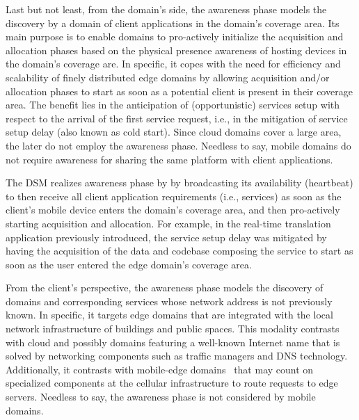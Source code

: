 
Last but not least, from the domain's side, the awareness phase models the discovery by a domain of client applications in the domain's coverage area. Its main purpose is to enable domains to pro-actively initialize the acquisition and allocation phases based on the physical presence awareness of hosting devices in the domain's coverage are. In specific, it copes with the need for efficiency and scalability of finely distributed edge domains by allowing acquisition and/or allocation phases to start as soon as a potential client is present in their coverage area. The benefit lies in the anticipation of (opportunistic) services setup with respect to the arrival of the first service request, i.e., in the mitigation of service setup delay (also known as cold start). Since cloud domains cover a large area, the later do not employ the awareness phase. Needless to say, mobile domains do not require awareness for sharing the same platform with client applications.

The DSM realizes awareness phase by by broadcasting its availability (heartbeat) to then receive all client application requirements (i.e., services) as soon as the client's mobile device enters the domain's coverage area, and then pro-actively starting acquisition and allocation. For example, in the real-time translation application previously introduced, the service setup delay was mitigated by having the acquisition of the data and codebase composing the service to start as soon as the user entered the edge domain's coverage area.

From the client's perspective, the awareness phase models the discovery of domains and corresponding services whose network address is not previously known. In specific, it targets edge domains that are integrated with the local network infrastructure of buildings and public spaces. This modality contrasts with cloud and possibly domains featuring a well-known Internet name that is solved by networking components such as traffic managers and DNS technology. Additionally, it contrasts with mobile-edge domains~\cite{ahmed2016isco} that may count on specialized components at the cellular infrastructure to route requests to edge servers. Needless to say, the awareness phase is not considered by mobile domains.

